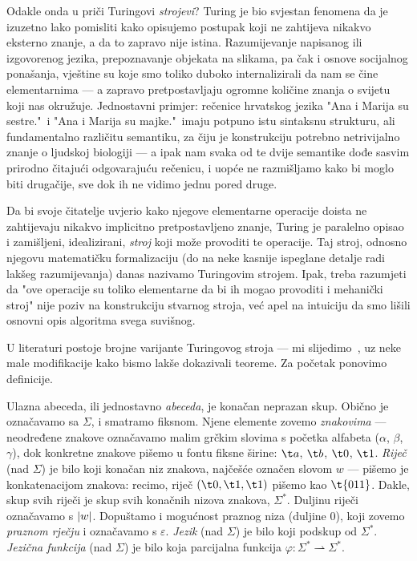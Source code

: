 Odakle onda u priči Turingovi \emph{strojevi}? Turing je bio svjestan fenomena da je izuzetno lako pomisliti kako opisujemo postupak koji ne zahtijeva nikakvo eksterno znanje, a da to zapravo nije istina. Razumijevanje napisanog ili izgovorenog jezika, prepoznavanje objekata na slikama, pa čak i osnove socijalnog ponašanja, vještine su koje smo toliko duboko internalizirali da nam se čine elementarnima --- a zapravo pretpostavljaju ogromne količine znanja o svijetu koji nas okružuje. Jednostavni primjer: rečenice hrvatskog jezika "Ana i Marija su sestre."\ i "Ana i Marija su majke."\ imaju potpuno istu sintaksnu strukturu, ali fundamentalno različitu semantiku, za čiju je konstrukciju potrebno netrivijalno znanje o ljudskoj biologiji --- a ipak nam svaka od te dvije semantike dođe sasvim prirodno čitajući odgovarajuću rečenicu, i uopće ne razmišljamo kako bi moglo biti drugačije, sve dok ih ne vidimo jednu pored druge.

Da bi svoje čitatelje uvjerio kako njegove elementarne operacije doista ne zahtijevaju nikakvo implicitno pretpostavljeno znanje, Turing je paralelno opisao i zamišljeni, idealizirani, \emph{stroj} koji može provoditi te operacije. Taj stroj, odnosno njegovu matematičku formalizaciju (do na neke kasnije ispeglane detalje radi lakšeg razumijevanja) danas nazivamo Turingovim strojem. Ipak, treba razumjeti da "ove operacije su toliko elementarne da bi ih mogao provoditi i mehanički stroj" nije poziv na konstrukciju stvarnog stroja, već apel na intuiciju da smo lišili osnovni opis algoritma svega suvišnog.

U literaturi postoje brojne varijante Turingovog stroja --- mi slijedimo~\cite{sipser}, uz neke male modifikacije kako bismo lakše dokazivali teoreme. Za početak ponovimo definicije.

Ulazna abeceda, ili jednostavno \emph{abeceda}, je konačan neprazan skup. Obično je označavamo sa $\Sigma$, i smatramo fiksnom. Njene elemente zovemo \emph{znakovima} --- ne\-od\-re\-đe\-ne znakove označavamo malim grčkim slovima s početka alfabeta ($\alpha$, $\beta$, $\gamma$), dok konkretne znakove pišemo u fontu fiksne širine: $\t a$, $\t b$, $\t 0$, $\t 1$. \emph{Riječ} (nad $\Sigma$) je bilo koji konačan niz znakova, najčešće označen slovom $w$ --- pišemo je konkatenacijom znakova: recimo, riječ $(\t0,\t1,\t1)$ pišemo kao $\t{011}$. Dakle, skup svih riječi je skup svih konačnih nizova znakova, $\Sigma^*$. Duljinu riječi označavamo s $\lvert w\rvert$. Dopuštamo i mogućnost praznog niza (duljine $0$), koji zovemo \emph{praznom rječju} i označavamo s $\varepsilon$. \emph{Jezik} (nad $\Sigma$) je bilo koji podskup od $\Sigma^*$. \emph{Jezična funkcija} (nad $\Sigma$) je bilo koja parcijalna funkcija $\varphi\colon\Sigma^*\rightharpoonup\Sigma^*$.

